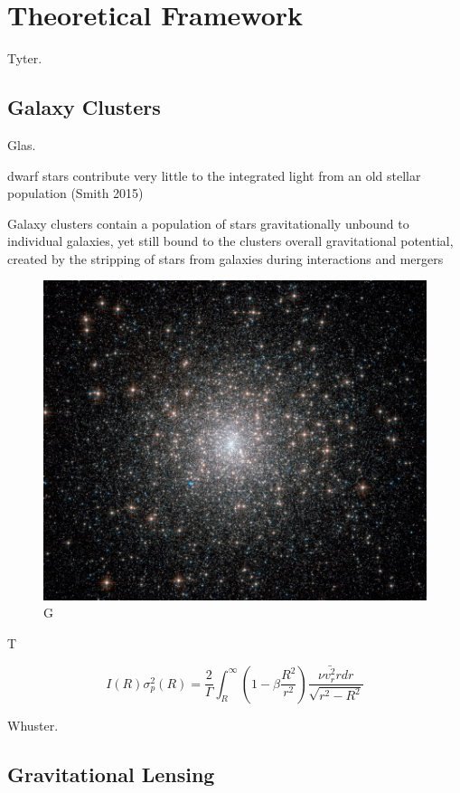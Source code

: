 \chapter{Theoretical Framework}

Tyter. 

\section{Galaxy Clusters}
 
Glas.

dwarf stars contribute very little to the integrated light from an old stellar population (Smith 2015)

Galaxy clusters contain a population of stars gravitationally unbound to individual galaxies, yet still bound to the clusters overall gravitational potential, created by the stripping of stars from galaxies during interactions and mergers

\begin{figure}[H]
\centering
\includegraphics[width=12cm]{images/m15.jpg}
\caption[M]{G}
\end{figure}

T 

\begin{equation}
I(R)\sigma_{p}^{2}(R)=\frac{2}{\Gamma}\int_{R}^{\infty}\left(1-\beta\frac{R^{2}}{r^{2}}\right)\frac{\nu\bar{v_{r}^{2}}rdr}{\sqrt{r^{2}-R^{2}}}
\end{equation}

Whuster.  

\section{Gravitational Lensing}

